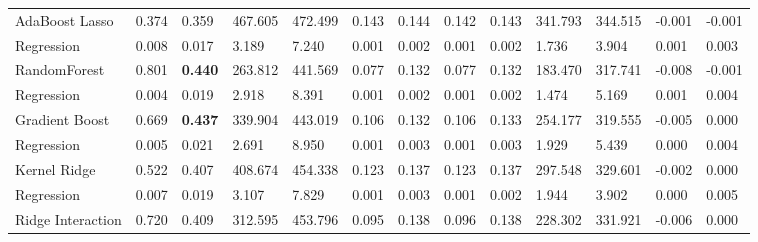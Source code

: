 \documentclass{article}
\begin{document}
{\begin{longtable}[c]{|p{2.3cm}|ll|ll|ll|ll|ll|ll|}
  AdaBoost Lasso & \multicolumn{1}{l|}{0.374} & 0.359 & \multicolumn{1}{l|}{467.605} & 472.499 & \multicolumn{1}{l|}{0.143} & 0.144 & \multicolumn{1}{l|}{0.142} & 0.143 & \multicolumn{1}{l|}{341.793} & 344.515 & \multicolumn{1}{l|}{-0.001} & -0.001 \\
  Regression & \multicolumn{1}{l|}{0.008} & 0.017 & \multicolumn{1}{l|}{3.189}   & 7.240   & \multicolumn{1}{l|}{0.001} & 0.002 & \multicolumn{1}{l|}{0.001} & 0.002 & \multicolumn{1}{l|}{1.736}   & 3.904   & \multicolumn{1}{l|}{0.001}  & 0.003  \\ \hline
  RandomForest & \multicolumn{1}{l|}{0.801} & \textbf{0.440} & \multicolumn{1}{l|}{263.812} & 441.569 & \multicolumn{1}{l|}{0.077} & 0.132 & \multicolumn{1}{l|}{0.077} & 0.132 & \multicolumn{1}{l|}{183.470} & 317.741 & \multicolumn{1}{l|}{-0.008} & -0.001 \\
  Regression & \multicolumn{1}{l|}{0.004} & 0.019 & \multicolumn{1}{l|}{2.918}   & 8.391   & \multicolumn{1}{l|}{0.001} & 0.002 & \multicolumn{1}{l|}{0.001} & 0.002 & \multicolumn{1}{l|}{1.474}   & 5.169   & \multicolumn{1}{l|}{0.001}  & 0.004  \\ \hline
  Gradient Boost & \multicolumn{1}{l|}{0.669} & \textbf{0.437} & \multicolumn{1}{l|}{339.904} & 443.019 & \multicolumn{1}{l|}{0.106} & 0.132 & \multicolumn{1}{l|}{0.106} & 0.133 & \multicolumn{1}{l|}{254.177} & 319.555 & \multicolumn{1}{l|}{-0.005} & 0.000  \\
  Regression & \multicolumn{1}{l|}{0.005} & 0.021 & \multicolumn{1}{l|}{2.691}   & 8.950   & \multicolumn{1}{l|}{0.001} & 0.003 & \multicolumn{1}{l|}{0.001} & 0.003 & \multicolumn{1}{l|}{1.929}   & 5.439   & \multicolumn{1}{l|}{0.000}  & 0.004  \\ \hline
  Kernel Ridge & \multicolumn{1}{l|}{0.522} & 0.407 & \multicolumn{1}{l|}{408.674} & 454.338 & \multicolumn{1}{l|}{0.123} & 0.137 & \multicolumn{1}{l|}{0.123} & 0.137 & \multicolumn{1}{l|}{297.548} & 329.601 & \multicolumn{1}{l|}{-0.002} & 0.000  \\
  Regression & \multicolumn{1}{l|}{0.007} & 0.019 & \multicolumn{1}{l|}{3.107}   & 7.829   & \multicolumn{1}{l|}{0.001} & 0.003 & \multicolumn{1}{l|}{0.001} & 0.002 & \multicolumn{1}{l|}{1.944}   & 3.902   & \multicolumn{1}{l|}{0.000}  & 0.005  \\ \hline
  Ridge Interaction & \multicolumn{1}{l|}{0.720} & 0.409 & \multicolumn{1}{l|}{312.595} & 453.796 & \multicolumn{1}{l|}{0.095} & 0.138 & \multicolumn{1}{l|}{0.096} & 0.138 & \multicolumn{1}{l|}{228.302} & 331.921 & \multicolumn{1}{l|}{-0.006} & 0.000  \\

\end{longtable}}
\end{document}
